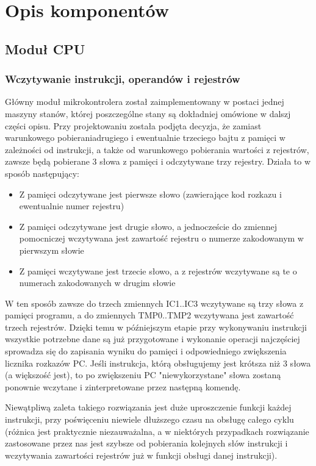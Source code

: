 \documentclass[a4paper,12pt]{report}
\begin{document}
\chapter{Opis komponentów}

\section{Moduł CPU}


\subsection{Wczytywanie instrukcji, operandów i rejestrów}
Główny moduł mikrokontrolera został zaimplementowany w postaci jednej maszyny stanów, której poszczególne stany są dokładniej omówione w dalszj części opisu. Przy projektowaniu została podjęta decyzja, że zamiast warunkowego pobieraniadrugiego i ewentualnie trzeciego bajtu z pamięci w zależności od instrukcji, a także od warunkowego pobierania wartości z rejestrów, zawsze będą pobierane 3 słowa z pamięci i odczytywane trzy rejestry. Działa to w sposób następujący:
\begin{itemize}
  \item Z pamięci odczytywane jest pierwsze słowo (zawierające kod rozkazu i ewentualnie numer rejestru)
  \item Z pamięci odczytywane jest drugie słowo, a jednoczeście do zmiennej pomocniczej wczytywana jest zawartość rejestru o numerze zakodowanym w pierwszym słowie
  \item Z pamięci wczytywane jest trzecie słowo, a z rejestrów wczytywane są te o numerach zakodowanych w drugim słowie
\end{itemize}
W ten sposób zawsze do trzech zmiennych IC1..IC3 wczytywane są trzy słowa z pamięci programu, a do zmiennych TMP0..TMP2 wczytywana jest zawartość trzech rejestrów. Dzięki temu w późniejszym etapie przy wykonywaniu instrukcji wszystkie potrzebne dane są już przygotowane i wykonanie operacji najczęściej sprowadza się do zapisania wyniku do pamięci i odpowiedniego zwiększenia licznika rozkazów PC. Jeśli instrukcja, którą obsługujemy jest krótsza niż 3 słowa (a większość jest), to po zwiększeniu PC "niewykorzystane" słowa zostaną ponownie wczytane i zinterpretowane przez następną komendę. 

Niewątpliwą zaleta takiego rozwiązania jest duże uproszczenie funkcji każdej instrukcji, przy poświęceniu niewiele dłuższego czasu na obsługę całego cyklu (różnica jest praktycznie niezauważalna, a w niektórych przypadkach rozwiązanie zastosowane przez nas jest szybsze od pobierania kolejnych słów instrukcji i wczytywania zawartości rejestrów już w funkcji obsługi danej instrukcji).
\end{document}
